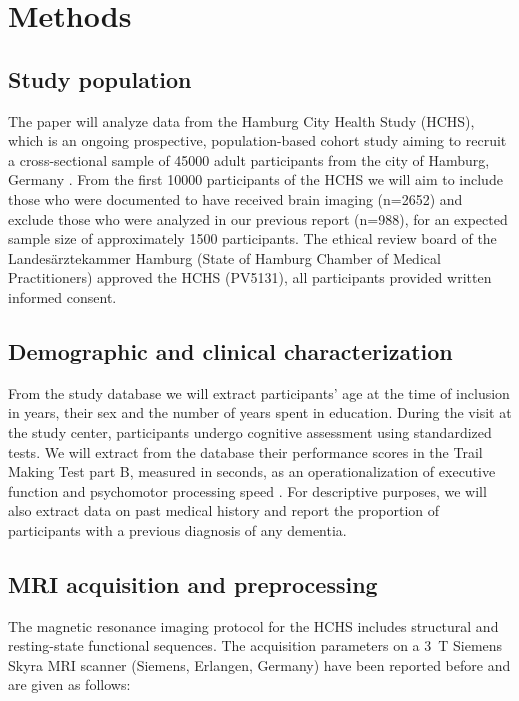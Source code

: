 \section{Methods} \label{methods}

\subsection{Study population}
The paper will analyze data from the Hamburg City Health Study (HCHS), which is an ongoing prospective, population-based cohort study aiming to recruit a cross-sectional sample of \num{45000} adult participants from the city of Hamburg, Germany \citep{Jagodzinski2020-lx}.
From the first \num{10000} participants of the HCHS we will aim to include those who were documented to have received brain imaging (n=2652) and exclude those who were analyzed in our previous report \citep{Schlemm2022-he} (n=988), for an expected sample size of approximately 1500 participants.
The ethical review board of the Landesärztekammer Hamburg (State of Hamburg Chamber of Medical Practitioners) approved the HCHS (PV5131), all participants provided written informed consent.

\subsection{Demographic and clinical characterization}
From the study database we will extract participants’ age at the time of inclusion in years, their sex and the number of years spent in education.
During the visit at the study center, participants undergo cognitive assessment using standardized tests.
We will extract from the database their performance scores in the Trail Making Test part B, measured in seconds, as an operationalization of executive function and psychomotor processing speed \citep{Tombaugh2004-dp,arbuthnott2000trail}.
For descriptive purposes, we will also extract data on past medical history and report the proportion of participants with a previous diagnosis of any dementia.

\subsection{MRI acquisition and preprocessing}
The magnetic resonance imaging protocol for the HCHS includes structural and resting-state functional sequences.
The acquisition parameters on a \qty{3}{\tesla} Siemens Skyra MRI scanner (Siemens, Erlangen, Germany) have been reported before \citep{Petersen2020-cx,Frey2021-sv} and are given as follows:

